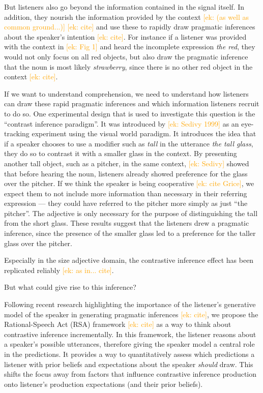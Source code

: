 \documentclass[10pt,letterpaper]{article}
\newcommand{\ek}[1]{\textcolor{Orange}{[ek: #1]}}
\begin{document}
But listeners also go beyond the information contained in the signal itself. In addition, they nourish the information provided by the context \ek{(as well as common ground...)} \ek{cite} and use these to rapidly draw pragmatic inferences about the speaker’s intention \ek{cite}. For instance if a listener was provided with the context in \ek{Fig 1} and heard the incomplete expression \textit{the red}, they would not only focus on all red objects, but also draw the pragmatic inference that the noun is most likely \textit{strawberry}, since there is no other red object in the context \ek{cite}.

If we want to understand comprehension, we need to understand how listeners can draw these rapid pragmatic inferences and which information listeners recruit to do so. One experimental design that is used to investigate this question is the ``contrast inference paradigm''. It was introduced by \ek{Sedivy 1999} as an eye-tracking experiment using the visual world paradigm. It introduces the idea that if a speaker chooses to use a modifier such as \textit{tall} in the utterance \textit{the tall glass}, they do so to contrast it with a smaller glass in the context. By presenting another tall object, such as a pitcher, in the same context, \ek{Sedivy} showed that before hearing the noun, listeners already showed preference for the glass over the pitcher. If we think the speaker is being cooperative \ek{cite Grice}, we expect them to not include more information than necessary in their referring expression — they could have referred to the pitcher more simply as just “the pitcher”. The adjective is only necessary for the purpose of distinguishing the tall from the short glass. These results suggest that the listeners drew a pragmatic inference, since the presence of the smaller glass led to a preference for the taller glass over the pitcher.

Especially in the size adjective domain, the contrastive inference effect has been replicated reliably \ek{as in... cite}.

But what could give rise to this inference? 

Following recent research highlighting the importance of the listener’s generative model of the speaker in generating pragmatic inferences \ek{cite}, we propose the Rational-Speech Act (RSA) framework \ek{cite} as a way to think about contrastive inference incrementally. In this framework, the listener reasons about a speaker's possible utterances, therefore giving the speaker model a central role in the predictions. It provides a way to quantitatively assess which predictions a listener with prior beliefs and expectations about the speaker \textit{should} draw. This shifts the focus away from factors that influence contrastive inference production onto listener's production expectations (and their prior beliefs).
\end{document}
